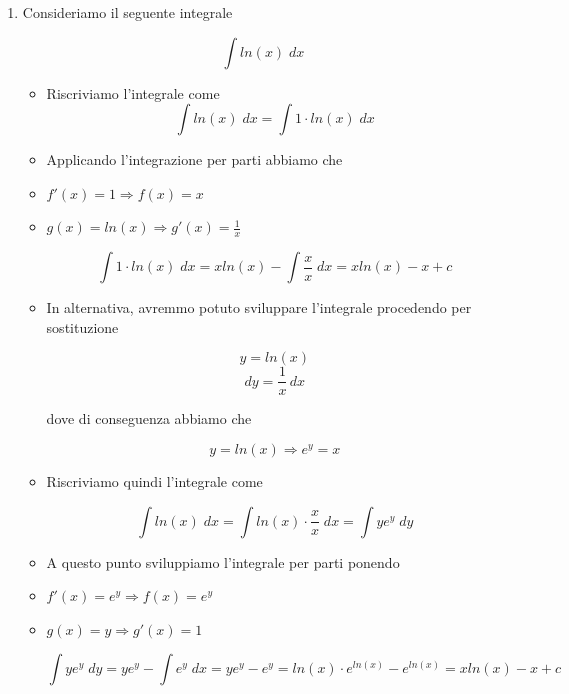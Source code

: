 \documentclass[a4paper, 12pt]{report}
\begin{document}
\begin{enumerate}
        \begin{itemize}
            \item Applicando l'integrazione per parti abbiamo che
            \item $f'(x) = \cos(2x) \Longrightarrow f(x) = \frac{\sin(2x)}{2}$
            \item $g(x) = x \Longrightarrow g'(x) = 1$
        \end{itemize}
        
        \[ \int_{0}^{\pi} x \cdot \cos(2x) \; dx = \frac{x \cdot \sin(2x)}{2} - \int \frac{\sin(2x)}{2} \; dx = \frac{x \cdot \sin(2x)}{2} + \frac{\cos(2x)}{4} = \]
        \[ = \left . \frac{2x \cdot \sin(2x) + \cos(2x)}{4} \right |_{0}^{\pi} = \frac{1}{4} - \frac{1}{4} = 0\]
        
        
        \item Consideriamo il seguente integrale
        
        \[ \int ln(x) \; dx\]
        
        \begin{itemize}
            \item Riscriviamo l'integrale come
            \[ \int ln(x) \; dx = \int 1 \cdot ln(x) \; dx\]
            
            \item Applicando l'integrazione per parti abbiamo che
            \item $f'(x) = 1 \Longrightarrow f(x) = x$
            \item $g(x) = ln(x) \Longrightarrow g'(x) = \frac{1}{x}$
        
        \[ \int 1 \cdot ln(x) \; dx = x ln(x) - \int \frac{x}{x} \; dx = x ln(x) - x + c\]
        
        \item In alternativa, avremmo potuto sviluppare l'integrale procedendo per sostituzione
        
        \[ y = ln(x)\]
        \[ dy = \frac{1}{x} \, dx \]
        
        dove di conseguenza abbiamo che
        
        \[ y = ln(x) \Longrightarrow e^y = x \]
        
        \item Riscriviamo quindi l'integrale come
        
        \[ \int ln(x) \; dx = \int ln(x) \cdot \frac{x}{x} \; dx = \int ye^y \; dy\]
        
        \item A questo punto sviluppiamo l'integrale per parti ponendo
        
        \item $f'(x) = e^y \Longrightarrow f(x) = e^y$
        \item $g(x) = y \Longrightarrow g'(x) = 1$
        
            \[\int ye^y \; dy = ye^y - \int e^y \; dx = ye^y - e^y = ln(x) \cdot e^{ln(x)} - e^{ln(x)} = xln(x)-x+c\]
            
        \end{itemize}
    \end{enumerate}
    
\end{document}
